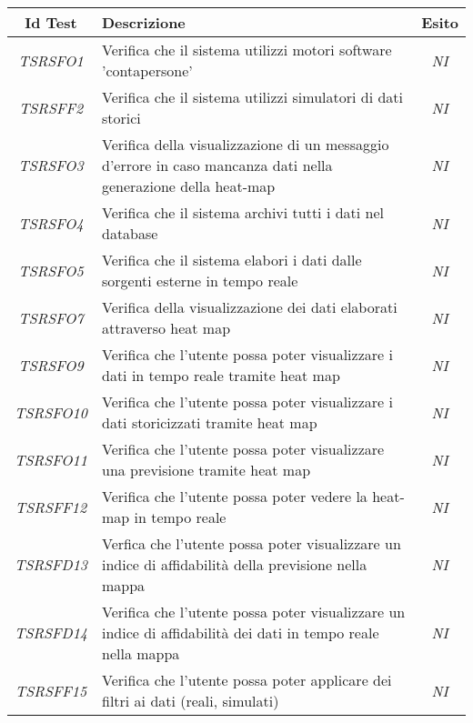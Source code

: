 \quad
\def\tabularxcolumn#1{m{#1}}
{

	\begin{center}
		\renewcommand{\arraystretch}{1.4}
		\begin{tabularx}{\textwidth}{|c|X|c|}
			\hline
			\rowcolor{airforceblue}
			\textbf{Id Test} & \textbf{Descrizione} & \textbf{Esito}\\
			\hline
			\textit{TSRSFO1} & Verifica che il sistema utilizzi motori software 'contapersone' & \textit{NI}\\
			\hline
			\textit{TSRSFF2} & Verifica che il sistema utilizzi simulatori di dati storici & \textit{NI}\\
			\hline
			\textit{TSRSFO3} & Verifica della visualizzazione di un messaggio d'errore in caso mancanza dati nella generazione della heat-map & \textit{NI}\\
			\hline
			\textit{TSRSFO4} & Verifica che il sistema archivi tutti i dati nel database & \textit{NI}\\
			\hline
			\textit{TSRSFO5} & Verifica che il sistema elabori i dati dalle sorgenti esterne in tempo reale & \textit{NI}\\
			\hline
			\textit{TSRSFO7} & Verifica della visualizzazione dei dati elaborati attraverso heat map & \textit{NI}\\
			\hline
			\textit{TSRSFO9} & Verifica che l’utente possa poter visualizzare i dati in tempo reale tramite heat map & \textit{NI}\\
			\hline
			\textit{TSRSFO10} & Verifica che l’utente possa poter visualizzare i dati storicizzati tramite heat map & \textit{NI}\\
			\hline
			\textit{TSRSFO11} & Verifica che l’utente possa poter visualizzare una previsione tramite heat map & \textit{NI}\\
			\hline
			\textit{TSRSFF12} & Verifica che l'utente possa poter vedere la heat-map in tempo reale & \textit{NI}\\
			\hline
			\textit{TSRSFD13} & Verfica che l’utente possa poter visualizzare un indice di affidabilità della previsione nella mappa & \textit{NI}\\
			\hline
			\textit{TSRSFD14} & Verifica che l’utente possa poter visualizzare un indice di affidabilità dei dati in tempo reale nella mappa & \textit{NI}\\
			\hline
			\textit{TSRSFF15} & Verifica che l’utente possa poter applicare dei filtri ai dati (reali, simulati) & \textit{NI}\\

\end{tabularx}
\end{center}}
